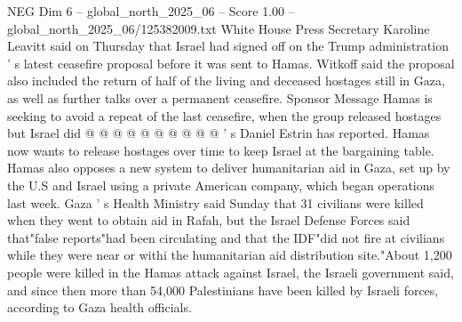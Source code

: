 \begin{textsample}{NEG Dim 6 – global\_north\_2025\_06 – Score 1.00 – global\_north\_2025\_06/125382009.txt}
White House Press Secretary Karoline Leavitt said on Thursday that Israel had signed off on the Trump administration ' s latest ceasefire proposal before it was sent to Hamas.
Witkoff said the proposal also included the return of half of the living and deceased hostages still in Gaza, as well as further talks over a permanent ceasefire.
Sponsor Message Hamas is seeking to avoid a repeat of the last ceasefire, when the group released hostages but Israel did @ @ @ @ @ @ @ @ @ @ ' s Daniel Estrin has reported.
Hamas now wants to release hostages over time to keep Israel at the bargaining table.
Hamas also opposes a new system to deliver humanitarian aid in Gaza, set up by the U.S and Israel using a private American company, which began operations last week.
Gaza ' s Health Ministry said Sunday that 31 civilians were killed when they went to obtain aid in Rafah, but the Israel Defense Forces said that"false reports"had been circulating and that the IDF"did not fire at civilians while they were near or withi the humanitarian aid distribution site."About 1,200 people were killed in the Hamas attack against Israel, the Israeli government said, and since then more than 54,000 Palestinians have been killed by Israeli forces, according to Gaza health officials.

\end{textsample}

